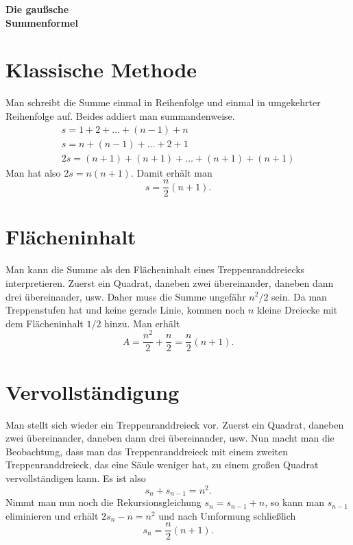 \documentclass[a4paper,10pt,fleqn,twocolumn,twoside]{article}
\begin{document}
\thispagestyle{empty}

\begin{huge}
\noindent
\textbf{Die gaußsche\\
Summenformel}
\par
\end{huge}


\section{Klassische Methode}

Man schreibt die Summe einmal in Reihenfolge und einmal in
umgekehrter Reihenfolge auf. Beides addiert man summandenweise.
\begin{gather*}
s = 1+2+\ldots+(n-1)+n\\
s = n+(n-1)+\ldots+2+1\\
2s = (n+1)+(n+1)+\ldots+(n+1)+(n+1)
\end{gather*}
Man hat also $2s=n(n+1)$. Damit erhält man
\[s = \frac{n}{2}(n+1).\]


\section{Flächeninhalt}

Man kann die Summe als den Flächeninhalt eines Treppenranddreiecks
interpretieren. Zuerst ein Quadrat, daneben zwei übereinander,
daneben dann drei übereinander, usw.
Daher muss die Summe ungefähr $n^2/2$ sein. Da man Treppenstufen
hat und keine gerade Linie, kommen noch $n$ kleine Dreiecke mit
dem Flächeninhalt $1/2$ hinzu. Man erhält
\[A = \frac{n^2}{2}+\frac{n}{2} = \frac{n}{2}(n+1).\]


\section{Vervollständigung}

Man stellt sich wieder ein Treppenranddreieck vor.
Zuerst ein Quadrat, daneben zwei übereinander, daneben dann drei übereinander, usw.
Nun macht man die Beobachtung, dass man das Treppenranddreieck mit
einem zweiten Treppenranddreieck, das eine Säule weniger hat,
zu einem großen Quadrat vervollständigen kann. Es ist also
\[s_n+s_{n-1} = n^2.\]
Nimmt man nun noch die Rekursionsgleichung $s_{n}=s_{n-1}+n$,
so kann man $s_{n-1}$ eliminieren und erhält $2s_n-n = n^2$
und nach Umformung schließlich
\[s_n = \frac{n}{2}(n+1).\]
\end{document}
